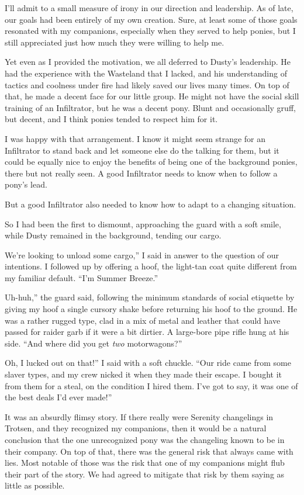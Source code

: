 I’ll admit to a small measure of irony in our direction and leadership. As of late, our goals had been entirely of my own creation. Sure, at least some of those goals resonated with my companions, especially when they served to help ponies, but I still appreciated just how much they were willing to help me.

Yet even as I provided the motivation, we all deferred to Dusty’s leadership. He had the experience with the Wasteland that I lacked, and his understanding of tactics and coolness under fire had likely saved our lives many times. On top of that, he made a decent face for our little group. He might not have the social skill training of an Infiltrator, but he was a decent pony. Blunt and occasionally gruff, but decent, and I think ponies tended to respect him for it.

I was happy with that arrangement. I know it might seem strange for an Infiltrator to stand back and let someone else do the talking for them, but it could be equally nice to enjoy the benefits of being one of the background ponies, there but not really seen. A good Infiltrator needs to know when to follow a pony’s lead.

But a good Infiltrator also needed to know how to adapt to a changing situation.

So I had been the first to dismount, approaching the guard with a soft smile, while Dusty remained in the background, tending our cargo.

\leavevmode{}We’re looking to unload some cargo,” I said in answer to the question of our intentions. I followed up by offering a hoof, the light-tan coat quite different from my familiar default. “I’m Summer Breeze.”

\leavevmode{}Uh-huh,” the guard said, following the minimum standards of social etiquette by giving my hoof a single cursory shake before returning his hoof to the ground. He was a rather rugged type, clad in a mix of metal and leather that could have passed for raider garb if it were a bit dirtier. A large-bore pipe rifle hung at his side. “And where did you get \textit{two} motorwagons?”

\leavevmode{}Oh, I lucked out on that!” I said with a soft chuckle. “Our ride came from some slaver types, and my crew nicked it when they made their escape. I bought it from them for a steal, on the condition I hired them. I’ve got to say, it was one of the best deals I’d ever made!”

It was an absurdly flimsy story. If there really were Serenity changelings in Trotsen, and they recognized my companions, then it would be a natural conclusion that the one unrecognized pony was the changeling known to be in their company. On top of that, there was the general risk that always came with lies. Most notable of those was the risk that one of my companions might flub their part of the story. We had agreed to mitigate that risk by them saying as little as possible.

